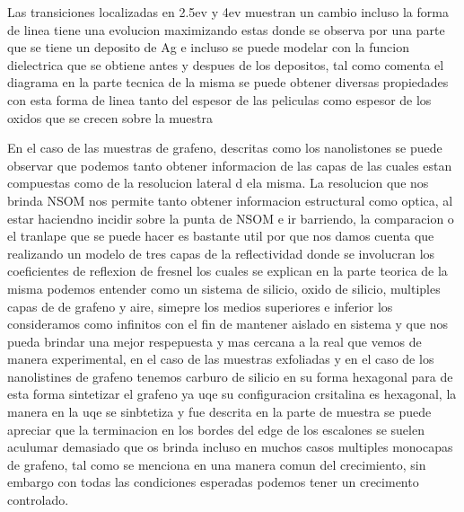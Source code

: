 Las transiciones localizadas en 2.5ev y 4ev muestran un cambio incluso la forma de linea tiene una evolucion maximizando estas donde se observa por una parte que se tiene un deposito de Ag e incluso se puede modelar con la funcion dielectrica que se obtiene antes y despues de los depositos, tal como comenta el diagrama en la parte tecnica de la misma se puede obtener diversas propiedades con esta forma de linea tanto del espesor de las peliculas como espesor de los oxidos que se crecen sobre la muestra


En el caso de las muestras de grafeno, descritas como los nanolistones se puede observar que podemos tanto obtener informacion de las capas de las cuales estan compuestas como de la resolucion lateral d ela misma. 
La resolucion que nos brinda NSOM nos permite tanto obtener informacion estructural como optica, al estar haciendno incidir sobre la punta de NSOM e ir barriendo, la comparacion o el tranlape que se puede hacer es bastante util por que nos damos cuenta que realizando un modelo de tres capas de la reflectividad donde se involucran los coeficientes de reflexion de fresnel los cuales se explican en la parte teorica de la misma podemos entender como un sistema de silicio, oxido de silicio, multiples capas de  de grafeno y aire, simepre los medios superiores e inferior los consideramos como infinitos con el fin de mantener aislado en sistema y que nos pueda brindar una mejor respepuesta y mas cercana a la real que vemos de manera experimental,  en el caso de las muestras exfoliadas y en el caso de los nanolistines de grafeno tenemos carburo de silicio en su forma hexagonal para de esta forma sintetizar el grafeno ya uqe su configuracion crsitalina es hexagonal, la manera en la uqe se sinbtetiza y fue descrita en la parte de muestra se puede apreciar que la terminacion en los bordes del edge de los escalones se suelen aculumar demasiado que os brinda incluso en muchos casos multiples monocapas de grafeno, tal como se menciona en una manera comun del crecimiento, sin embargo con todas las condiciones esperadas podemos tener un crecimento controlado.

